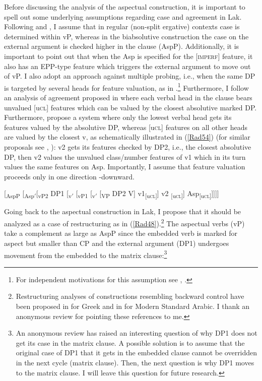 \documentclass[output=paper]{langscibook}
\begin{document}
Before discussing the analysis of the aspectual construction, it is important to spell out some underlying assumptions regarding case and agreement in Lak. Following \cite{GagliardiRadkevich2014} and \citet{Radkevich2017},  I assume that in regular (non-split ergative) contexts  case is determined within vP, whereas in the biabsolutive construction the case on the external argument is checked higher in the clause (AspP). Additionally, it is important to point out that when the Asp is specified for the [\textsc{imperf}] feature, it also has an EPP-type feature which triggers the external argument to move out of vP. I also adopt an approach against multiple probing, i.e., when the same DP is targeted by several heads for feature valuation, as in \citet{PolinskyChumakina2017}.\footnote{For independent motivations for this assumption see \cite{Rezac2003}, \cite{BakerWillie2010}.} Furthermore, I follow an analysis of agreement proposed in \citet{PolinskyChumakina2017} where each verbal head in the clause bears unvalued [u\textsc{cl}] features which can be valued by the closest absolutive marked DP. Furthermore, \citet{PolinskyChumakina2017} propose a system where only the lowest verbal head gets its features valued by the absolutive DP, whereas [u\textsc{cl}] features on all other heads are valued by the closest v, as schematically illustrated in (\ref{Rad54}) (for similar proposals see \citealt{Collins2003}, \citealt{BakerWillie2010}): v2 gets its features checked by DP2, i.e., the closest absolutive DP, then v2 values the unvalued class/number features of v1 which in its turn values the same features on Asp. Importantly, I assume that feature valuation proceeds only in one direction -downward.


\ea\label{Rad54}

[\textsubscript{AspP} [\textsubscript{Asp$'$}[\textsubscript{vP2} DP1 [\textsubscript{v$'$} [\textsubscript{vP1} [\textsubscript{v$'$} [\textsubscript{VP} DP2 V]  v1\textsubscript{[u\textsc{cl}]}] v2 \textsubscript{[u\textsc{cl}]}] Asp\textsubscript{[u\textsc{cl}]}]]]]\\
\z

Going back to the aspectual construction in Lak, I propose that it should be analyzed as a case of restructuring as in (\ref{Rad48}).\footnote{Restructuring analyses of constructions resembling backward control have been proposed in \cite{Roussou2009} for Greek and in \cite{GreshlerWintner2017} for Modern Standard Arabic. I thank an anonymous review for pointing these references to me.} The aspectual verbs (vP) take a complement as large as AspP since the embedded verb is marked for aspect but smaller than CP and the external argument (DP1) undergoes movement from the embedded to the matrix clause:\footnote{An anonymous review has raised an interesting question of why DP1 does not get its case in the matrix clause. A possible solution is to assume that the original case of DP1 that it gets in the embedded clause cannot be overridden in the next cycle (matrix clause). Then, the next question is why DP1 moves to the matrix clause. I will leave this question for future research.}
\end{document}
